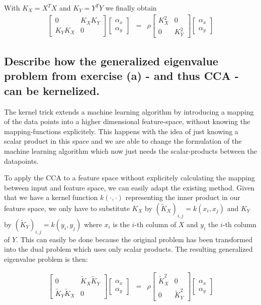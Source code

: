 \documentclass[a4paper, 12pt, titlepage]{article}
\begin{document}
With $K_X = X^TX$ and $K_Y = Y^TY$ we finally obtain
\begin{eqnarray*}
	\begin{bmatrix}
		0 & K_XK_Y\\
		K_YK_X & 0
	\end{bmatrix}
	\begin{bmatrix}
		\alpha_x\\
		\alpha_y
	\end{bmatrix} &=& \rho
	\begin{bmatrix}
		K_X^2 & 0\\
		0 &K_Y^2
	\end{bmatrix}
	\begin{bmatrix}
		\alpha_x\\
		\alpha_y
	\end{bmatrix}
\end{eqnarray*}

\subsection{Describe how the generalized eigenvalue problem from exercise (a) - and thus CCA - can be kernelized.}
The kernel trick extends a machine learning algorithm by introducing a mapping of the data points into a higher dimensional feature-space, without knowing the mapping-functions explicitely.  This happens with the idea of just knowing a scalar product in this space and we are able to change the formulation of the machine learning algorithm which now just needs the scalar-products between the datapoints.


To apply the CCA to a feature space without explicitely calculating the mapping between input and feature space, we can easily adapt the existing method.
Given that we have a kernel function $k(\cdot,\cdot)$ representing the inner product in our feature space, we only have to substitute $K_X$ by $(\tilde{K}_X)_{i,j} = k(x_i,x_j)$ and $K_Y$ by $(\tilde{K}_Y)_{i,j} = k(y_i,y_j)$ where $x_i$ is the $i$-th column of $X$ and $y_i$ the $i$-th column of $Y$.
This can easily be done because the original problem has been transformed into the dual problem which uses only scalar products.
The resulting generalized eigenvalue problem is then:

\begin{eqnarray*}
	\begin{bmatrix}
		0 & \tilde{K}_X\tilde{K}_Y\\
		\tilde{K}_Y\tilde{K}_X & 0
	\end{bmatrix}
	\begin{bmatrix}
		\alpha_x\\
		\alpha_y
	\end{bmatrix} &=& \rho
	\begin{bmatrix}
		\tilde{K}_X^2 & 0\\
		0 &\tilde{K}_Y^2
	\end{bmatrix}
	\begin{bmatrix}
		\alpha_x\\
		\alpha_y
	\end{bmatrix}
\end{eqnarray*}
\end{document}
